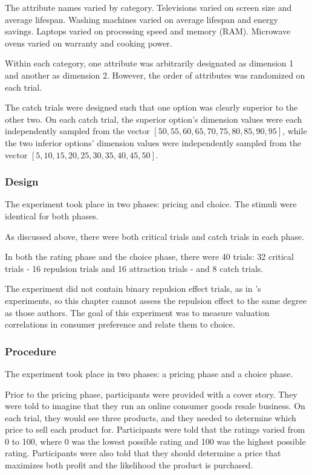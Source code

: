 The attribute names varied by category. Televisions varied on screen size and average lifespan. Washing machines varied on average lifespan and energy savings. Laptops varied on processing speed and memory (RAM). Microwave ovens varied on warranty and cooking power. 

Within each category, one attribute was arbitrarily designated as dimension 1 and another as dimension 2. However, the order of attributes was randomized on each trial.

The catch trials were designed such that one option was clearly superior to the other two. On each catch trial, the superior option's dimension values were each independently sampled from the vector $[50,55,60,65,70,75,80,85,90,95]$, while the two inferior options' dimension values were independently sampled from the vector $[5,10,15,20,25,30,35,40,45,50]$. 

\subsubsection{Design}

The experiment took place in two phases: pricing and choice. The stimuli were identical for both phases.

As discussed above, there were both critical trials and catch trials in each phase. 

In both the rating phase and the choice phase, there were 40 trials: 32 critical trials - 16 repulsion trials and 16 attraction trials - and 8 catch trials.

The experiment did not contain binary repulsion effect trials, as in \textcite{banerjeeFactorsThatPromote2024}'s experiments, so this chapter cannot assess the repulsion effect to the same degree as those authors. The goal of this experiment was to measure valuation correlations in consumer preference and relate them to choice.

\subsubsection{Procedure}

The experiment took place in two phases: a pricing phase and a choice phase.

Prior to the pricing phase, participants were provided with a cover story. They were told to imagine that they run an online consumer goods resale business. On each trial, they would see three products, and they needed to determine which price to sell each product for. Participants were told that the ratings varied from 0 to 100, where 0 was the lowest possible rating and 100 was the highest possible rating. Participants were also told that they should determine a price that maximizes both profit and the likelihood the product is purchased. 

